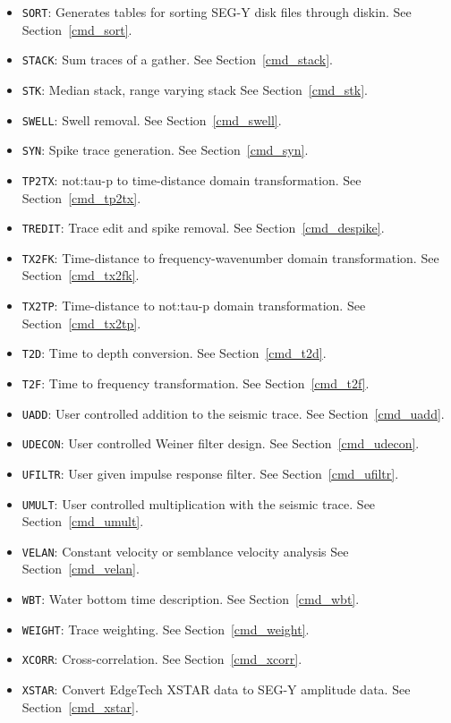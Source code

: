 \begin{itemize}
    \item \texttt{SORT}: Generates tables for sorting SEG-Y disk files through diskin. See Section~\ref{cmd_sort}.
    \item \texttt{STACK}: Sum traces of a \gls{gather}. See Section~\ref{cmd_stack}.
    \item \texttt{STK}: Median stack, range varying stack See Section~\ref{cmd_stk}.
    \item \texttt{SWELL}: Swell removal. See Section~\ref{cmd_swell}.
    \item \texttt{SYN}: Spike trace generation. See Section~\ref{cmd_syn}.
    \item \texttt{TP2TX}: \gls{not:tau}-p to time-distance domain transformation. See Section~\ref{cmd_tp2tx}.
    \item \texttt{TREDIT}: Trace edit and spike removal. See Section~\ref{cmd_despike}.
    \item \texttt{TX2FK}: Time-distance to frequency-wavenumber domain transformation. See Section~\ref{cmd_tx2fk}.
    \item \texttt{TX2TP}: Time-distance to \gls{not:tau}-p domain transformation. See Section~\ref{cmd_tx2tp}.
    \item \texttt{T2D}: Time to depth conversion. See Section~\ref{cmd_t2d}.
    \item \texttt{T2F}: Time to frequency transformation. See Section~\ref{cmd_t2f}.
    \item \texttt{UADD}: User controlled addition to the seismic trace. See Section~\ref{cmd_uadd}.
    \item \texttt{UDECON}: User controlled Weiner filter design. See Section~\ref{cmd_udecon}.
    \item \texttt{UFILTR}: User given impulse response filter. See Section~\ref{cmd_ufiltr}.
    \item \texttt{UMULT}: User controlled multiplication with the seismic trace. See Section~\ref{cmd_umult}.
    \item \texttt{VELAN}: Constant velocity or semblance velocity analysis See Section~\ref{cmd_velan}.
    \item \texttt{WBT}: Water bottom time description. See Section~\ref{cmd_wbt}.
    \item \texttt{WEIGHT}: Trace weighting. See Section~\ref{cmd_weight}.
    \item \texttt{XCORR}: Cross-correlation. See Section~\ref{cmd_xcorr}.
    \item \texttt{XSTAR}: Convert EdgeTech XSTAR data to SEG-Y amplitude data. See Section~\ref{cmd_xstar}.
\end{itemize}

